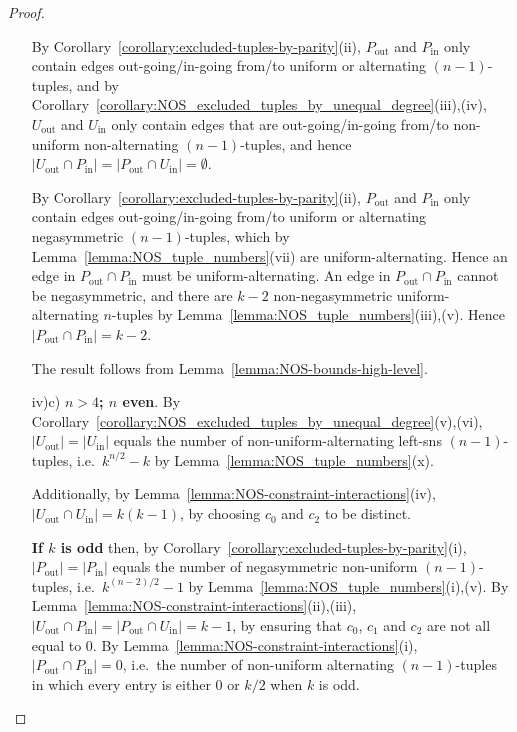 \documentclass[10pt,a4paper]{amsart}
\begin{document}
\begin{proof}
\begin{itemize}
    By Corollary~\ref{corollary:excluded-tuples-by-parity}(ii), $P_{\text{out}}$ and
    $P_{\text{in}}$ only contain edges out-going/in-going from/to uniform or alternating
    $(n-1)$-tuples, and by
    Corollary~\ref{corollary:NOS_excluded_tuples_by_unequal_degree}(iii),(iv), $U_{\text{out}}$
    and $U_{\text{in}}$ only contain edges that are out-going/in-going from/to non-uniform
    non-alternating $(n-1)$-tuples, and hence $|U_{\text{out}}\cap
    P_{\text{in}}|=|P_{\text{out}}\cap U_{\text{in}}|=\emptyset$.

    By Corollary~\ref{corollary:excluded-tuples-by-parity}(ii), $P_{\text{out}}$ and
    $P_{\text{in}}$ only contain edges out-going/in-going from/to uniform or alternating
    negasymmetric $(n-1)$-tuples, which by Lemma~\ref{lemma:NOS_tuple_numbers}(vii) are
    uniform-alternating. Hence an edge in $P_{\text{out}}\cap P_{\text{in}}$ must be
    uniform-alternating.  An edge in $P_{\text{out}}\cap P_{\text{in}}$ cannot be
    negasymmetric, and there are $k-2$ non-negasymmetric uniform-alternating $n$-tuples by
    Lemma~\ref{lemma:NOS_tuple_numbers}(iii),(v).  Hence$|P_{\text{out}}\cap
    P_{\text{in}}|=k-2$.

    The result follows from Lemma~\ref{lemma:NOS-bounds-high-level}.

\item[iv)c)] {\bf $n>4$; $n$ even}. By
    Corollary~\ref{corollary:NOS_excluded_tuples_by_unequal_degree}(v),(vi),
    $|U_{\text{out}}|=|U_{\text{in}}|$ equals the number of non-uniform-alternating left-sns
    $(n-1)$-tuples, i.e.\ $k^{n/2}-k$ by Lemma~\ref{lemma:NOS_tuple_numbers}(x).

    Additionally, by Lemma~\ref{lemma:NOS-constraint-interactions}(iv), $|U_{\text{out}}\cap
    U_{\text{in}}|=k(k-1)$, by choosing $c_0$ and $c_2$ to be distinct.

    {\bf If $k$ is odd} then, by Corollary~\ref{corollary:excluded-tuples-by-parity}(i),
    $|P_{\text{out}}|=|P_{\text{in}}|$ equals the number of negasymmetric non-uniform
    $(n-1)$-tuples, i.e.\ $k^{(n-2)/2}-1$ by Lemma~\ref{lemma:NOS_tuple_numbers}(i),(v).
     \newline By Lemma~\ref{lemma:NOS-constraint-interactions}(ii),(iii), $|U_{\text{out}}\cap
    P_{\text{in}}|=|P_{\text{out}}\cap U_{\text{in}}|=k-1$, by ensuring that $c_0$,
    $c_1$ and $c_2$ are not all equal to $0$.
     \newline By Lemma~\ref{lemma:NOS-constraint-interactions}(i), $|P_{\text{out}}\cap
    P_{\text{in}}|=0$, i.e.\ the number of non-uniform alternating $(n-1)$-tuples in which
    every entry is either 0 or $k/2$ when $k$ is odd.


\end{itemize}
\end{proof}
\end{document}
